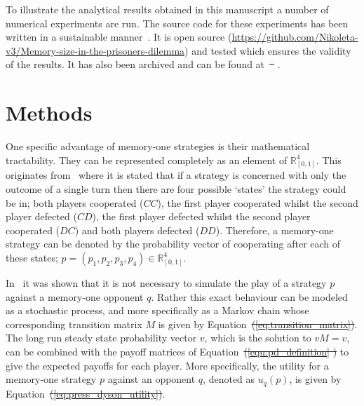 \documentclass[fleqn,10pt]{wlscirep}
\newcommand{\R}{\mathbb{R}}
\providecommand{\DIFadd}[1]{{\protect\color{blue}\uwave{#1}}} %
\providecommand{\DIFdel}[1]{{\protect\color{red}\sout{#1}}}                      %
\providecommand{\DIFaddbegin}{} %
\providecommand{\DIFaddend}{} %
\providecommand{\DIFdelbegin}{} %
\providecommand{\DIFdelend}{} %
\begin{document}
To illustrate the analytical results obtained in this manuscript a number of
numerical experiments are run. The source code for these experiments has been
written in a sustainable manner~\cite{Benureau2018}.
It is open source (\url{https://github.com/Nikoleta-v3/Memory-size-in-the-prisoners-dilemma})
and tested which ensures the validity of the results. It has also been archived
and can be found at~\DIFdelbegin \DIFdel{\mbox{%
\cite{nikoleta_glynatsi_2019}}\hspace{0pt}%
}\DIFdelend \DIFaddbegin \DIFadd{\mbox{%
\cite{opt_mo2019}}\hspace{0pt}%
}\DIFaddend .

\section*{Methods}
One specific advantage of memory-one strategies is their mathematical
tractability. They can be represented completely as an element of \(\R^{4}_{[0, 1]}\). This
originates from~\cite{Nowak1989} where it is stated that if a strategy is
concerned with only the outcome of a single turn then there are four possible
`states' the strategy could be in; both players cooperated (\(CC\)),
the first player cooperated whilst the second player defected (\(CD\)),
the first player defected whilst the second player cooperated (\(DC\)) and
both players defected (\(DD\)).
Therefore, a memory-one strategy can be denoted by the probability vector of
cooperating after each of these states; \(p=(p_1, p_2, p_3, p_4) \in \R_{[0,1]}
^ 4\).

In~\cite{Nowak1989} it was shown that it is not necessary to simulate the play
of a strategy $p$ against a memory-one opponent $q$. Rather this exact behaviour
can be modeled as a stochastic process, and more specifically as a Markov chain
whose corresponding transition matrix \(M\) is
given by Equation~\DIFdelbegin \DIFdel{(\ref{eq:transition_matrix})}\DIFdelend \DIFaddbegin \DIFadd{\ref{eq:transition_matrix}}\DIFaddend . The long run steady state probability
vector \(v\), which is the solution to \(v M = v\), can be
combined with the payoff matrices of Equation~\DIFdelbegin \DIFdel{(\ref{equ:pd_definition} ) }\DIFdelend \DIFaddbegin \DIFadd{\ref{equ:pd_definition} }\DIFaddend to give the expected
payoffs for each player. More specifically, the utility for a memory-one
strategy \(p\) against an opponent \(q\), denoted as \(u_q(p)\), is given by
Equation~\DIFdelbegin \DIFdel{(\ref{eq:press_dyson_utility})}\DIFdelend \DIFaddbegin \DIFadd{\ref{eq:press_dyson_utility}}\DIFaddend .
\end{document}
